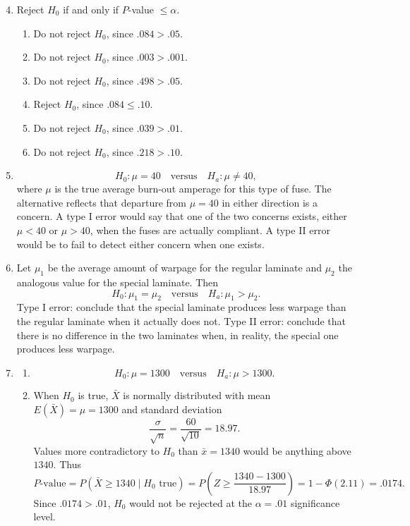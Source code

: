 \documentclass[12pt]{article}
\begin{document}
\begin{enumerate}[label=\textbf{\arabic*.}, leftmargin=*]

\setcounter{enumi}{3}
\item
Reject $H_0$ if and only if $P$-value $\le \alpha$.
\begin{enumerate}[label=\alph*.]
    \item Do not reject $H_0$, since $.084>.05$.
    \item Do not reject $H_0$, since $.003>.001$.
    \item Do not reject $H_0$, since $.498>.05$.
    \item Reject $H_0$, since $.084\le.10$.
    \item Do not reject $H_0$, since $.039>.01$.
    \item Do not reject $H_0$, since $.218>.10$.
\end{enumerate}

\setcounter{enumi}{7}
\item
\[
H_0:\mu=40\quad\text{versus}\quad H_a:\mu\ne40,
\]
where $\mu$ is the true average burn-out amperage for this type of fuse. The alternative reflects that departure from $\mu=40$ in either direction is a concern. A type I error would say that one of the two concerns exists, either $\mu<40$ or $\mu>40$, when the fuses are actually compliant. A type II error would be to fail to detect either concern when one exists.

\setcounter{enumi}{9}
\item
Let $\mu_1$ be the average amount of warpage for the regular laminate and $\mu_2$ the analogous value for the special laminate. Then
\[
H_0:\mu_1=\mu_2\quad\text{versus}\quad H_a:\mu_1>\mu_2.
\]
Type I error: conclude that the special laminate produces less warpage than the regular laminate when it actually does not. Type II error: conclude that there is no difference in the two laminates when, in reality, the special one produces less warpage.

\setcounter{enumi}{11}
\item
\begin{enumerate}[label=\alph*.]
    \item
    \[
    H_0:\mu=1300\quad\text{versus}\quad H_a:\mu>1300.
    \]

    \item When $H_0$ is true, $\bar{X}$ is normally distributed with mean $E(\bar{X})=\mu=1300$ and standard deviation
    \[
    \frac{\sigma}{\sqrt{n}}=\frac{60}{\sqrt{10}}=18.97.
    \]
    Values more contradictory to $H_0$ than $\bar{x}=1340$ would be anything above $1340$. Thus
    \[
    P\text{-value}=P(\bar{X}\ge1340\mid H_0\text{ true})
    =P\left(Z\ge\frac{1340-1300}{18.97}\right)
    =1-\Phi(2.11)=.0174.
    \]
    Since $.0174>.01$, $H_0$ would not be rejected at the $\alpha=.01$ significance level.


\end{enumerate}
\end{enumerate}
\end{document}
